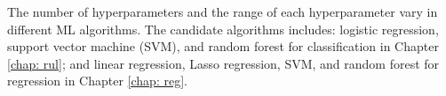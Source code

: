 The number of hyperparameters and the range of each hyperparameter vary in different ML algorithms. The candidate algorithms includes: logistic regression, support vector machine (SVM), and random forest for classification in Chapter \ref{chap: rul}; and linear regression, Lasso regression, SVM, and random forest for regression in Chapter \ref{chap: reg}.